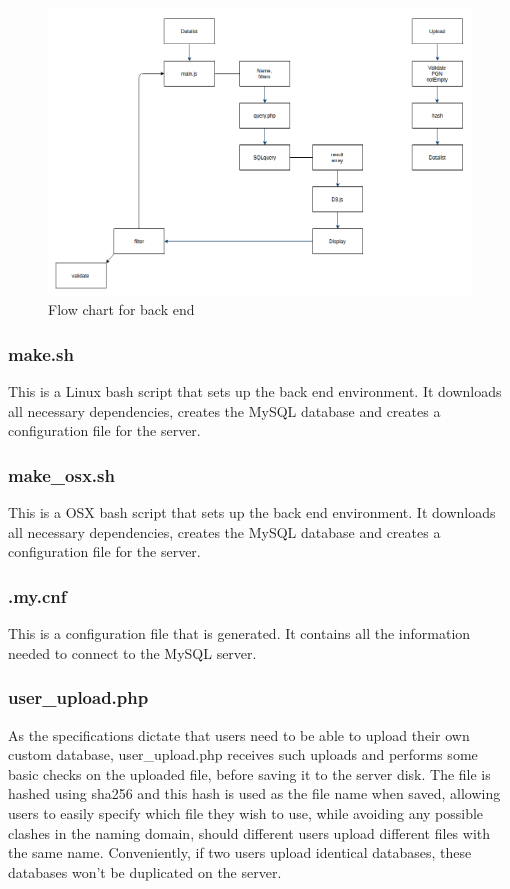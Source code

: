 \documentclass{article}
\begin{document}
\begin{figure}[h]
	\centering
	\includegraphics[scale=0.3]{backflow}
	\caption{Flow chart for back end}
	\label{figure:5}
\end{figure}

\subsubsection{make.sh}
This is a Linux bash script that sets up the back end environment.
It downloads all necessary dependencies, creates the MySQL database
and creates a configuration file for the server.

\subsubsection{make\_osx.sh}
This is a OSX bash script that sets up the back end environment.
It downloads all necessary dependencies, creates the MySQL database and
creates a configuration file for the server.

\subsubsection{.my.cnf}
This is a configuration file that is generated. It contains all the
information needed to connect to the MySQL server.

\subsubsection{user\_upload.php}
As the specifications dictate that users need to be able to upload their own
custom database, user\_upload.php receives such uploads and
performs some basic checks on the uploaded file, before saving it to the
server disk. The file is hashed using sha256\cite{sha} and this hash is used
as
the file name when saved, allowing users to easily specify which file
they wish to use, while avoiding any possible clashes in the naming
domain, should different users upload different files with the same name.
Conveniently, if two users upload identical databases, these databases
won't be duplicated on the server.
\end{document}
